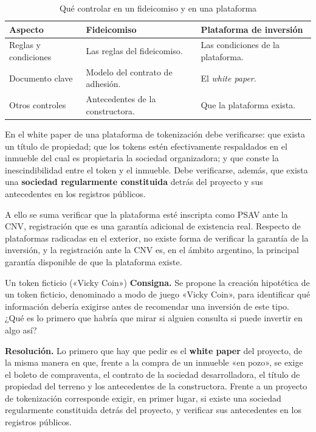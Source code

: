 \documentclass[12pt,oneside]{book}
\begin{document}
\begin{table}[H]
\centering
\caption{Qué controlar en un fideicomiso y en una plataforma}
\renewcommand{\arraystretch}{1.2}
\begin{tabularx}{\textwidth}{>{\raggedright\arraybackslash}p{}XX}
\toprule
\textbf{Aspecto} & \textbf{Fideicomiso} & \textbf{Plataforma de inversión} \\
\midrule
Reglas y condiciones & Las reglas del fideicomiso. & Las condiciones de la plataforma. \\
Documento clave & Modelo del contrato de adhesión. & El \emph{white paper}. \\
Otros controles & Antecedentes de la constructora. & Que la plataforma exista. \\
\bottomrule
\end{tabularx}
\end{table}

\begin{important}
En el white paper de una plataforma de tokenización debe verificarse: que exista un título de propiedad; que los tokens estén efectivamente respaldados en el inmueble del cual es propietaria la sociedad organizadora; y que conste la inescindibilidad entre el token y el inmueble. Debe verificarse, además, que exista una \textbf{sociedad regularmente constituida} detrás del proyecto y sus antecedentes en los registros públicos.
\end{important}

A ello se suma verificar que la plataforma esté inscripta como PSAV ante la CNV, registración que es una garantía adicional de existencia real. Respecto de plataformas radicadas en el exterior, no existe forma de verificar la garantía de la inversión, y la registración ante la CNV es, en el ámbito argentino, la principal garantía disponible de que la plataforma existe.

\begin{exercise}{Un token ficticio («Vicky Coin»)}
\textbf{Consigna.} Se propone la creación hipotética de un token ficticio, denominado a modo de juego «Vicky Coin», para identificar qué información debería exigirse antes de recomendar una inversión de este tipo. ¿Qué es lo primero que habría que mirar si alguien consulta si puede invertir en algo así?

\textbf{Resolución.} Lo primero que hay que pedir es el \textbf{white paper} del proyecto, de la misma manera en que, frente a la compra de un inmueble «en pozo», se exige el boleto de compraventa, el contrato de la sociedad desarrolladora, el título de propiedad del terreno y los antecedentes de la constructora. Frente a un proyecto de tokenización corresponde exigir, en primer lugar, si existe una sociedad regularmente constituida detrás del proyecto, y verificar sus antecedentes en los registros públicos.
\end{exercise}
\end{document}
